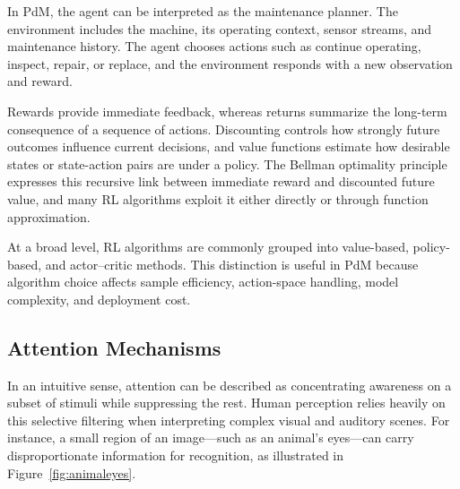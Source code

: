\documentclass[12pt,oneside]{book}
\begin{document}
In PdM, the agent can be interpreted as the maintenance planner. The environment includes the machine, its operating context, sensor streams, and maintenance history. The agent chooses actions such as continue operating, inspect, repair, or replace, and the environment responds with a new observation and reward.

Rewards provide immediate feedback, whereas returns summarize the long-term consequence of a sequence of actions. Discounting controls how strongly future outcomes influence current decisions, and value functions estimate how desirable states or state-action pairs are under a policy. The Bellman optimality principle expresses this recursive link between immediate reward and discounted future value, and many RL algorithms exploit it either directly or through function approximation.

At a broad level, RL algorithms are commonly grouped into value-based, policy-based, and actor--critic methods. This distinction is useful in PdM because algorithm choice affects sample efficiency, action-space handling, model complexity, and deployment cost.

\subsection{Attention Mechanisms}\label{sec:intro-attention}
In an intuitive sense, attention can be described as concentrating awareness on a subset of stimuli while suppressing the rest. Human perception relies heavily on this selective filtering when interpreting complex visual and auditory scenes. For instance, a small region of an image---such as an animal's eyes---can carry disproportionate information for recognition, as illustrated in Figure~\ref{fig:animaleyes}.
\end{document}
